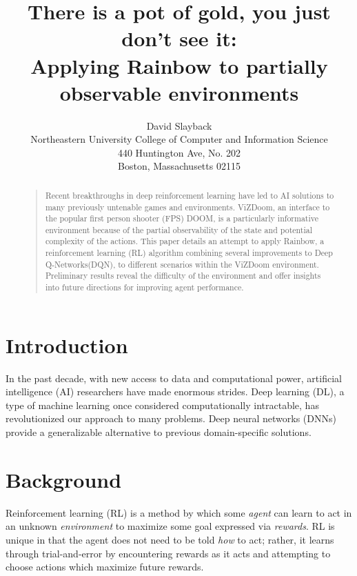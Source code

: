 \documentclass[letterpaper]{article}
\begin{document}
	\title{There is a pot of gold, you just don't see it: \\ Applying Rainbow to partially observable environments}
	\author{David Slayback\\
		Northeastern University College of Computer and Information Science\\
		440 Huntington Ave, No. 202\\
		Boston, Massachusetts 02115\\
	}
	\maketitle
	\begin{abstract}
		\begin{quote}
			Recent breakthroughs in deep reinforcement learning have led to AI solutions to many previously untenable games and environments. ViZDoom, an interface to the popular first person shooter (FPS) DOOM, is a particularly informative environment because of the partial observability of the state and potential complexity of the actions. This paper details an attempt to apply Rainbow, a reinforcement learning (RL) algorithm combining several improvements to Deep Q-Networks(DQN), to different scenarios within the ViZDoom environment. Preliminary results reveal the difficulty of the environment and offer insights into future directions for improving agent performance.
		\end{quote}
	\end{abstract} 
	
	\section{Introduction}
	
	In the past decade, with new access to data and computational power, artificial intelligence (AI) researchers have made enormous strides. Deep learning (DL), a type of machine learning once considered computationally intractable, has revolutionized our approach to many problems. Deep neural networks (DNNs) provide a generalizable alternative to previous domain-specific solutions. 
	
	\section{Background}
	
	Reinforcement learning (RL) is a method by which some \textit{agent} can learn to act in an unknown \textit{environment} to maximize some goal expressed via \textit{rewards}. RL is unique in that the agent does not need to be told \textit{how} to act; rather, it learns through trial-and-error by encountering rewards as it acts and attempting to choose actions which maximize future rewards.
	
\end{document}
